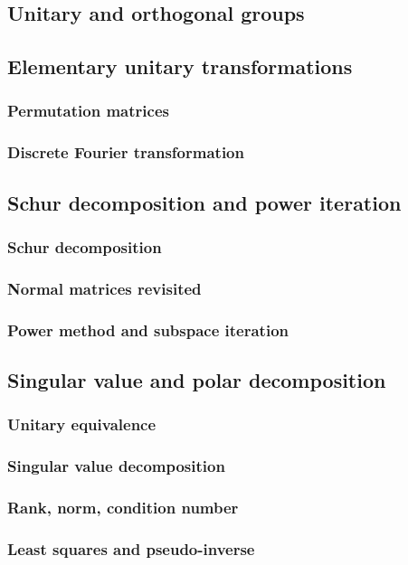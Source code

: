 \documentclass[a4paper,twoside]{article}
\theoremstyle{definition}
\theoremstyle{plain}
\begin{document}
\subsection{Unitary and orthogonal groups}
\subsection{Elementary unitary transformations}
\subsubsection{Permutation matrices}
\subsubsection{Discrete Fourier transformation}
\subsection{Schur decomposition and power iteration}
\subsubsection{Schur decomposition}
\subsubsection{Normal matrices revisited}
\subsubsection{Power method and subspace iteration}
\subsection{Singular value and polar decomposition}
\subsubsection{Unitary equivalence}
\subsubsection{Singular value decomposition}
\subsubsection{Rank, norm, condition number}
\subsubsection{Least squares and pseudo-inverse}
\end{document}
